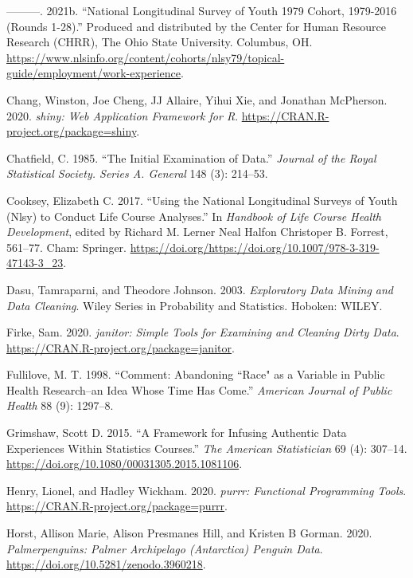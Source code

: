 \documentclass{article}
\begin{document}
\leavevmode\hypertarget{ref-nlsy79guide}{}%
---------. 2021b. ``National Longitudinal Survey of Youth 1979 Cohort, 1979-2016 (Rounds 1-28).'' Produced and distributed by the Center for Human Resource Research (CHRR), The Ohio State University. Columbus, OH. \url{https://www.nlsinfo.org/content/cohorts/nlsy79/topical-guide/employment/work-experience}.

\leavevmode\hypertarget{ref-shiny}{}%
Chang, Winston, Joe Cheng, JJ Allaire, Yihui Xie, and Jonathan McPherson. 2020. \emph{shiny: Web Application Framework for R}. \url{https://CRAN.R-project.org/package=shiny}.

\leavevmode\hypertarget{ref-Chatfield1985TIEo}{}%
Chatfield, C. 1985. ``The Initial Examination of Data.'' \emph{Journal of the Royal Statistical Society. Series A. General} 148 (3): 214--53.

\leavevmode\hypertarget{ref-eliznlsy}{}%
Cooksey, Elizabeth C. 2017. ``Using the National Longitudinal Surveys of Youth (Nlsy) to Conduct Life Course Analyses.'' In \emph{Handbook of Life Course Health Development}, edited by Richard M. Lerner Neal Halfon Christoper B. Forrest, 561--77. Cham: Springer. \url{https://doi.org/https://doi.org/10.1007/978-3-319-47143-3_23}.

\leavevmode\hypertarget{ref-DasuTamraparni2003Edma}{}%
Dasu, Tamraparni, and Theodore Johnson. 2003. \emph{Exploratory Data Mining and Data Cleaning}. Wiley Series in Probability and Statistics. Hoboken: WILEY.

\leavevmode\hypertarget{ref-janitor}{}%
Firke, Sam. 2020. \emph{janitor: Simple Tools for Examining and Cleaning Dirty Data}. \url{https://CRAN.R-project.org/package=janitor}.

\leavevmode\hypertarget{ref-racismnotrace}{}%
Fullilove, M. T. 1998. ``Comment: Abandoning ``Race" as a Variable in Public Health Research--an Idea Whose Time Has Come.'' \emph{American Journal of Public Health} 88 (9): 1297--8.

\leavevmode\hypertarget{ref-grimshaw}{}%
Grimshaw, Scott D. 2015. ``A Framework for Infusing Authentic Data Experiences Within Statistics Courses.'' \emph{The American Statistician} 69 (4): 307--14. \url{https://doi.org/10.1080/00031305.2015.1081106}.

\leavevmode\hypertarget{ref-purrr}{}%
Henry, Lionel, and Hadley Wickham. 2020. \emph{purrr: Functional Programming Tools}. \url{https://CRAN.R-project.org/package=purrr}.

\leavevmode\hypertarget{ref-penguins-data}{}%
Horst, Allison Marie, Alison Presmanes Hill, and Kristen B Gorman. 2020. \emph{Palmerpenguins: Palmer Archipelago (Antarctica) Penguin Data}. \url{https://doi.org/10.5281/zenodo.3960218}.
\end{document}
